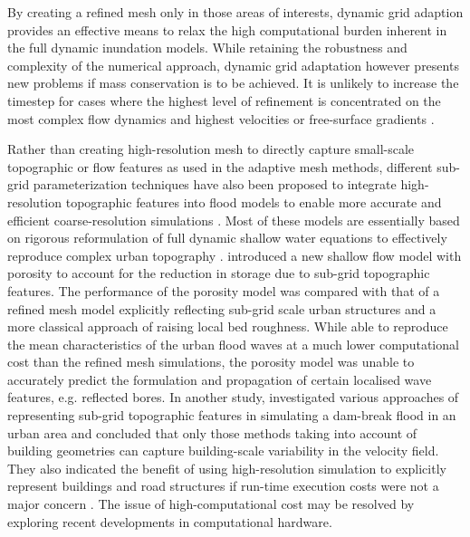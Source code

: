 \documentclass[11pt,english,a4paper]{article}
\begin{document}
By creating a refined mesh only in those areas of interests, dynamic grid adaption provides an effective means to relax the high computational burden inherent in the full dynamic inundation models. While retaining the robustness and complexity of the numerical approach, dynamic grid adaptation however presents new problems if mass conservation is to be achieved. It is unlikely to increase the timestep for cases where the highest level of refinement is concentrated on the most complex flow dynamics and highest velocities or free-surface gradients \citep[see descriptions of refinement criteria in][]{Liang2008a,Kubatko2009}.

Rather than creating high-resolution mesh to directly capture small-scale topographic or flow features as used in the adaptive mesh methods, different sub-grid parameterization techniques have also been proposed to integrate high-resolution topographic features into flood models to enable more accurate and efficient coarse-resolution simulations \citep[e.g.][]{Soares-Frazao2008,Guinot2012,Schubert2012,Chen2012}. Most of these models are essentially based on rigorous reformulation of full dynamic shallow water equations to effectively reproduce complex urban topography \citep[e.g.][]{Soares-Frazao2008,Guinot2012,Schubert2012}. \citet{Soares-Frazao2008} introduced a new shallow flow model with porosity to account for the reduction in storage due to sub-grid topographic features. The performance of the porosity model was compared with that of a refined mesh model explicitly reflecting sub-grid scale urban structures and a more classical approach of raising local bed roughness. While able to reproduce the mean characteristics of the urban flood waves at a much lower computational cost than the refined mesh simulations, the porosity model was unable to accurately predict the formulation and propagation of certain localised wave features, e.g. reflected bores. In another study, \citet{Schubert2012} investigated various approaches of representing sub-grid topographic features in simulating a dam-break flood in an urban area and concluded that only those methods taking into account of building geometries can capture building-scale variability in the velocity field. They also indicated the benefit of using high-resolution simulation to explicitly represent buildings and road structures if run-time execution costs were not a major concern \citep[see also][]{Gallegos2009}. The issue of high-computational cost may be resolved by exploring recent developments in computational hardware.
\end{document}
